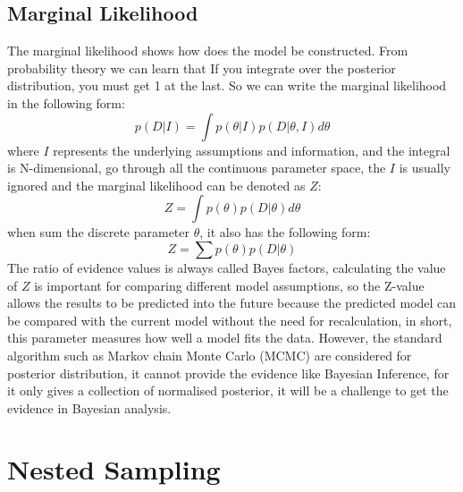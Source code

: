 \documentclass[11pt]{book}
\begin{document}
\subsection{Marginal Likelihood}
The marginal likelihood shows how does the model be constructed.
From probability theory we can learn that If you integrate over the posterior distribution, you must get 1 at the last. 
So we can write the marginal likelihood in the following form:
\begin{equation}
	p(D|I) = \int p(\theta|I)p(D|\theta, I)d\theta
\end{equation}
where $I$ represents the underlying assumptions and information, and the integral is N-dimensional, go through all the continuous parameter space, the $I$ is 
usually ignored and the marginal likelihood can be denoted as $Z$:
\begin{equation}
	Z = \int p(\theta)p(D|\theta)d\theta
\end{equation}
when sum the discrete parameter $\theta$, it also has the following form:
\begin{equation}
	Z = \sum p(\theta)p(D|\theta)
\end{equation}
The ratio of evidence values is always called Bayes factors, calculating the value of $Z$ 
is important for comparing different model assumptions, so the Z-value allows the results to be predicted into the future 
because the predicted model can be compared with the current model without the need for recalculation, in short, this parameter measures how well a model fits the data.
However, the standard algorithm such as Markov chain Monte Carlo (MCMC) are considered for posterior distribution, it cannot provide the evidence like Bayesian Inference,
for it only gives a collection of normalised posterior, it will be a challenge to get the evidence in Bayesian analysis.


\section{Nested Sampling} 
\end{document}
